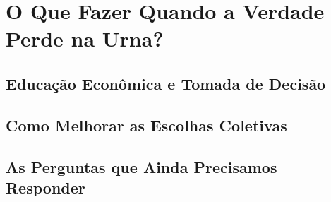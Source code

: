 

\chapter{O Que Fazer Quando a Verdade Perde na Urna?} %




\section{Educação Econômica e Tomada de Decisão} %




\section{Como Melhorar as Escolhas Coletivas} %




\section{As Perguntas que Ainda Precisamos Responder} %








